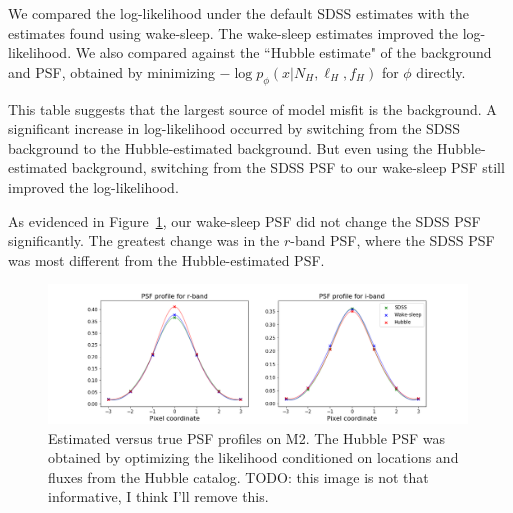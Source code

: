 We compared the log-likelihood under the default SDSS estimates with the estimates found using wake-sleep. The wake-sleep estimates improved the log-likelihood. We also compared against the ``Hubble estimate" of the background and PSF, obtained by minimizing 
$- \log p_\phi(x | N_{H}, \ell_{H}, f_{H})$ for $\phi$ directly. 

This table suggests that the largest source of model misfit is the background. A significant increase in log-likelihood occurred by switching from the SDSS background to the Hubble-estimated background. 
But even using the Hubble-estimated background, switching from the SDSS PSF to our wake-sleep PSF still improved the log-likelihood. 



As evidenced in Figure~\ref{fig:psf_profiles}, our wake-sleep PSF did not change the SDSS PSF significantly. The greatest change was in the $r$-band PSF, where the SDSS PSF was most different from the Hubble-estimated PSF. 

\begin{figure}[ht]
    \centering
    \includegraphics[width=0.99\textwidth]{figures/psf_profiles.png}
    \caption{Estimated versus true PSF profiles on M2. The Hubble PSF was
    obtained by optimizing the likelihood conditioned on locations and fluxes
    from the Hubble catalog. TODO: this image is not that informative, I think I'll remove this. }
    \label{fig:psf_profiles}
\end{figure}



